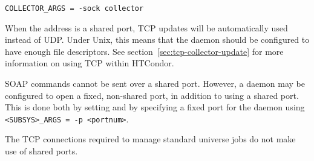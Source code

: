 \begin{verbatim}
COLLECTOR_ARGS = -sock collector
\end{verbatim}

When the  address is a shared port,
TCP updates will be automatically used instead of UDP.
Under Unix, this means that the
 daemon should be configured to have enough file descriptors.
See section~\ref{sec:tcp-collector-update} for more information on using
TCP within HTCondor.

SOAP commands cannot be sent over a shared port.
However, a daemon may be configured to open a fixed, non-shared port,
in addition to using a shared port.
This is done both by setting
 and by specifying a fixed port for the daemon
using \verb|<SUBSYS>_ARGS = -p <portnum>|.

The TCP connections required to manage standard universe jobs do not
make use of shared ports.


